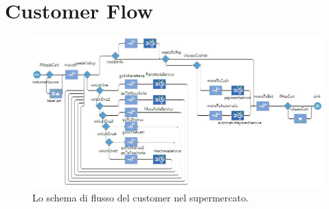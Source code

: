 \documentclass{article}
\begin{document}
\section{Customer Flow}

\begin{center}
\begin{figure}[h]
\center
\label{custflow}
\includegraphics[scale=0.5]{./cust_flow.jpg}
\caption{\footnotesize{Lo schema di flusso del customer nel supermercato.}}
\end{figure}
\end{center}
\end{document}

